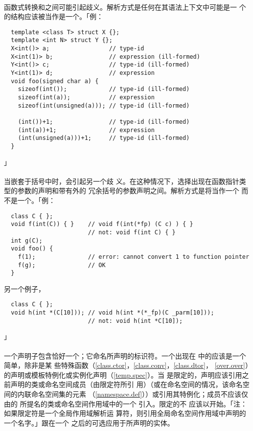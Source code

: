 \paragraph{}
函数式转换和之间可能引起歧义。解析方式是任何在其语法上下文中可能是一
个的结构应该被当作是一个。「例：
\begin{lstlisting}
  template <class T> struct X {};
  template <int N> struct Y {};
  X<int()> a;                 // type-id
  X<int(1)> b;                // expression (ill-formed)
  Y<int()> c;                 // type-id (ill-formed)
  Y<int(1)> d;                // expression
  void foo(signed char a) {
    sizeof(int());            // type-id (ill-formed)
    sizeof(int(a));           // expression
    sizeof(int(unsigned(a))); // type-id (ill-formed)

    (int())+1;                // type-id (ill-formed)
    (int(a))+1;               // expression
    (int(unsigned(a)))+1;     // type-id (ill-formed)
  }
\end{lstlisting}」

\paragraph{}
当嵌套于括号中时，会引起另一个歧
义。在这种情况下，选择出现在函数指针类型的参数的声明和带有外的
冗余括号的参数声明之间。解析方式是将当作一个
而不是一个。「例：
\begin{lstlisting}
  class C { };
  void f(int(C)) { }    // void f(int(*fp) (C c) ) { }
                        // not: void f(int C) { }
  int g(C);
  void foo() {
    f(1);               // error: cannot convert 1 to function pointer
    f(g);               // OK
  }
\end{lstlisting}
另一个例子，
\begin{lstlisting}
  class C { };
  void h(int *(C[10])); // void h(int *(*_fp)(C _parm[10]));
                        // not: void h(int *C[10]);
\end{lstlisting}」

\paragraph{}
一个声明子包含恰好一个；它命名所声明的标识符。一个出现在
中的应该是一个简单，除非是某
些特殊函数（\ref{class.ctor}，\ref{class.conv}，\ref{class.dtor}，
\ref{over.over}）的声明或模板特例化或实例化声明（\ref{temp.spec}）。当
是限定的，声明应该引用之前声明的类或命名空间成员（由限定符所引
用）（或在命名空间的情况，该命名空间的内联命名空间集的元素
（\ref{namespace.def}））或引用其特例化；成员不应该仅由的
所提名的类或命名空间作用域中的一个
引入。限定的不
应该以开始。「注：如果限定符是一个\tm{::}全局作用域解析运
算符，则引用全局命名空间作用域中声明的一个名字。」跟在一个
之后的可选应用于所声明的实体。

